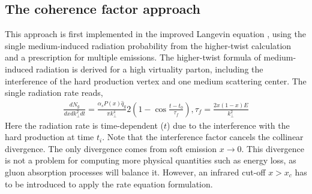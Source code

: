 \subsection{The coherence factor approach}
This approach is first implemented in the improved Langevin equation \cite{Cao:2013ita}, using the single medium-induced radiation probability from the higher-twist calculation \cite{Majumder:2009ge,Wang:2001ifa} and a prescription for multiple emissions.
The higher-twist formula of medium-induced radiation is derived for a high virtuality parton, including the interference of the hard production vertex and one medium scattering center.
The single radiation rate reads,
\begin{eqnarray}
\frac{dN_g}{dx dk_\perp^2 dt} = \frac{\alpha_s P(x)\hat{q}_g}{\pi k_\perp^4} 2\left(1-\cos\frac{t-t_0}{\tau_f}\right), \tau_f = \frac{2x(1-x)E}{k_\perp^2}
\end{eqnarray}
Here the radiation rate is time-dependent ($t$) due to the interference with the hard production at time $t_i$. 
Note that the interference factor cancels the collinear divergence. 
The only divergence comes from soft emission $x\rightarrow 0$. 
This divergence is not a problem for computing more physical quantities such as energy loss, as gluon absorption processes will balance it.
However, an infrared cut-off $x>x_c$ has to be introduced to apply the rate equation formulation. 

